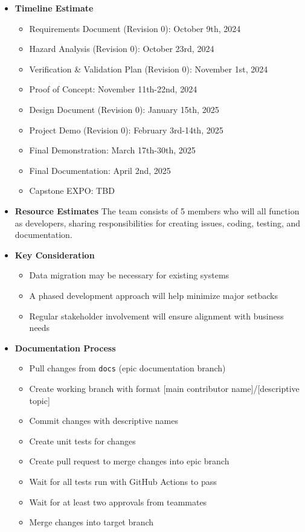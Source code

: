 \documentclass[12pt]{article}
\begin{document}
\begin{itemize}
\begin{itemize}
  \end{itemize}
  \item \textbf{Timeline Estimate}
    \begin{itemize}
        \item Requirements Document (Revision 0): October 9th, 2024
        \item Hazard Analysis (Revision 0): October 23rd, 2024
        \item Verification \& Validation Plan (Revision 0): November 1st, 2024
        \item Proof of Concept: November 11th-22nd, 2024
        \item Design Document (Revision 0): January 15th, 2025
        \item Project Demo (Revision 0): February 3rd-14th, 2025
        \item Final Demonstration: March 17th-30th, 2025
        \item Final Documentation: April 2nd, 2025
        \item Capstone EXPO: TBD
    \end{itemize}
    
  \item \textbf{Resource Estimates}
  The team consists of 5 members who will all function as developers, sharing responsibilities for creating issues, coding, testing, and documentation.

  \item \textbf{Key Consideration}
    \begin{itemize}
        \item Data migration may be necessary for existing systems
        \item A phased development approach will help minimize major setbacks
        \item Regular stakeholder involvement will ensure alignment with business needs
    \end{itemize}

  \item \textbf{Documentation Process}
    \begin{itemize}
        \item Pull changes from \texttt{docs} (epic documentation branch)
        \item Create working branch with format [main contributor name]/[descriptive topic]
        \item Commit changes with descriptive names
        \item Create unit tests for changes
        \item Create pull request to merge changes into epic branch
        \item Wait for all tests run with GitHub Actions to pass
        \item Wait for at least two approvals from teammates
        \item Merge changes into target branch
    \end{itemize}
  
\end{itemize}
\end{document}
